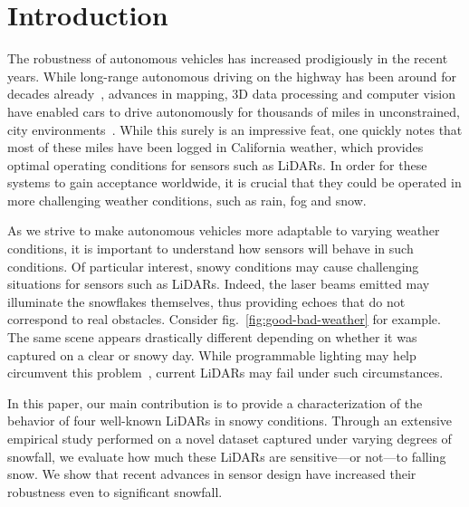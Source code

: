 \section{Introduction}

The robustness of autonomous vehicles has increased prodigiously in the recent years. While long-range autonomous driving on the highway has been around for decades already~\cite{Pomerleau_1996_616}, advances in mapping, 3D data processing and computer vision have enabled cars to drive autonomously for thousands of miles in unconstrained, city environments~\cite{urmson2008autonomous}. While this surely is an impressive feat, one quickly notes that most of these miles have been logged in California weather, which provides optimal operating conditions for sensors such as LiDARs. In order for these systems to gain acceptance worldwide, it is crucial that they could be operated in more challenging weather conditions, such as rain, fog and snow. 

As we strive to make autonomous vehicles more adaptable to varying weather conditions, it is important to understand how sensors will behave in such conditions. Of particular interest, snowy conditions may cause challenging situations for sensors such as LiDARs. Indeed, the laser beams emitted may illuminate the snowflakes themselves, thus providing echoes that do not correspond to real obstacles. Consider fig.~\ref{fig:good-bad-weather} for example. The same scene appears drastically different depending on whether it was captured on a clear or snowy day. While programmable lighting may help circumvent this problem~\cite{tamburo2014programmable}, current LiDARs may fail under such circumstances. 

In this paper, our main contribution is to provide a characterization of the behavior of four well-known LiDARs in snowy conditions. Through an extensive empirical study performed on a novel dataset captured under varying degrees of snowfall, we evaluate how much these LiDARs are sensitive---or not---to falling snow. We show that recent advances in sensor design have increased their robustness even to significant snowfall. 

